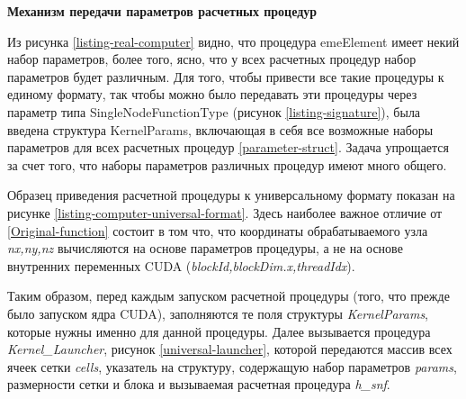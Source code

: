 
\textbf{Механизм передачи параметров расчетных процедур}


Из рисунка \ref{listing-real-computer} видно, что процедура emeElement имеет некий набор параметров, более того, ясно, что у всех расчетных процедур набор параметров будет различным. Для
того, чтобы привести все такие процедуры к единому формату, так чтобы можно было передавать эти процедуры через параметр типа SingleNodeFunctionType (рисунок \ref{listing-signature}), была введена структура KernelParams, включающая в себя все возможные наборы параметров для всех расчетных процедур \ref{parameter-struct}. Задача упрощается за счет того, что наборы параметров различных процедур имеют много общего. 

Образец приведения расчетной процедуры к универсальному формату показан на рисунке \ref{listing-computer-universal-format}. Здесь наиболее важное отличие от \ref{Original-function} состоит в том что, что координаты обрабатываемого узла \textit{nx,ny,nz} вычисляются на основе параметров процедуры, а не на основе внутренних переменных CUDA (\textit{blockId,blockDim.x,threadIdx}).

Таким образом, перед каждым запуском расчетной процедуры (того, что прежде было запуском ядра CUDA), заполняются те поля структуры \textit{KernelParams}, которые нужны именно для данной процедуры.
Далее вызывается процедура \textit{Kernel\_Launcher}, рисунок \ref{universal-launcher}, которой передаются массив всех ячеек сетки \textit{cells}, указатель на структуру, содержащую набор параметров \textit{params}, размерности сетки и блока  и вызываемая расчетная процедура \textit{h\_snf}.

